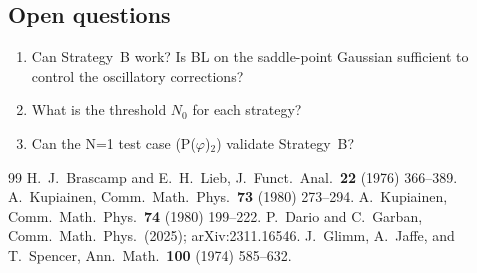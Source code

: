 \documentclass[12pt]{article}
\theoremstyle{definition}
\theoremstyle{remark}
\newcommand{\ph}{\varphi}
\begin{document}
\subsection{Open questions}

\begin{enumerate}
\item Can Strategy~B work? Is BL on the saddle-point Gaussian
  sufficient to control the oscillatory corrections?
\item What is the threshold $N_0$ for each strategy?
\item Can the N=1 test case (P($\ph$)$_2$) validate Strategy~B?
\end{enumerate}

\begin{thebibliography}{99}
 H.~J.~Brascamp and E.~H.~Lieb,
  J.~Funct.~Anal.~\textbf{22} (1976) 366--389.
 A.~Kupiainen,
  Comm.~Math.~Phys.~\textbf{73} (1980) 273--294.
 A.~Kupiainen,
  Comm.~Math.~Phys.~\textbf{74} (1980) 199--222.
 P.~Dario and C.~Garban,
  Comm.~Math.~Phys.~(2025); arXiv:2311.16546.
 J.~Glimm, A.~Jaffe, and T.~Spencer,
  Ann.~Math.~\textbf{100} (1974) 585--632.
\end{thebibliography}
\end{document}

